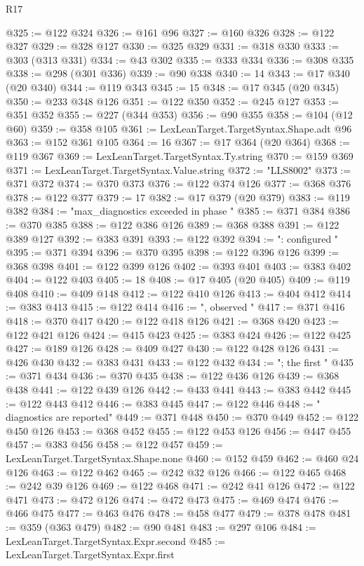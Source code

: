 \begin{lexlean}{R17}
\begin{coremodule}
@325 := @122 @324
@326 := @161 @96
@327 := @160 @326
@328 := @122 @327
@329 := @328 @127
@330 := @325 @329
@331 := @318 @330
@333 := @303 (@313 @331)
@334 := @43 @302
@335 := @333 @334
@336 := @308 @335
@338 := @298 (@301 @336)
@339 := @90 @338
@340 := 14
@343 := @17 @340 (@20 @340)
@344 := @119 @343
@345 := 15
@348 := @17 @345 (@20 @345)
@350 := @233 @348 @126
@351 := @122 @350
@352 := @245 @127
@353 := @351 @352
@355 := @227 (@344 @353)
@356 := @90 @355
@358 := @104 (@12 @60)
@359 := @358 @105
@361 := LexLeanTarget.TargetSyntax.Shape.adt @96
@363 := @152 @361 @105
@364 := 16
@367 := @17 @364 (@20 @364)
@368 := @119 @367
@369 := LexLeanTarget.TargetSyntax.Ty.string
@370 := @159 @369
@371 := LexLeanTarget.TargetSyntax.Value.string
@372 := "LLS8002"
@373 := @371 @372
@374 := @370 @373
@376 := @122 @374 @126
@377 := @368 @376
@378 := @122 @377
@379 := 17
@382 := @17 @379 (@20 @379)
@383 := @119 @382
@384 := "max_diagnostics exceeded in phase "
@385 := @371 @384
@386 := @370 @385
@388 := @122 @386 @126
@389 := @368 @388
@391 := @122 @389 @127
@392 := @383 @391
@393 := @122 @392
@394 := ": configured "
@395 := @371 @394
@396 := @370 @395
@398 := @122 @396 @126
@399 := @368 @398
@401 := @122 @399 @126
@402 := @393 @401
@403 := @383 @402
@404 := @122 @403
@405 := 18
@408 := @17 @405 (@20 @405)
@409 := @119 @408
@410 := @409 @148
@412 := @122 @410 @126
@413 := @404 @412
@414 := @383 @413
@415 := @122 @414
@416 := ", observed "
@417 := @371 @416
@418 := @370 @417
@420 := @122 @418 @126
@421 := @368 @420
@423 := @122 @421 @126
@424 := @415 @423
@425 := @383 @424
@426 := @122 @425
@427 := @189 @126
@428 := @409 @427
@430 := @122 @428 @126
@431 := @426 @430
@432 := @383 @431
@433 := @122 @432
@434 := "; the first "
@435 := @371 @434
@436 := @370 @435
@438 := @122 @436 @126
@439 := @368 @438
@441 := @122 @439 @126
@442 := @433 @441
@443 := @383 @442
@445 := @122 @443 @412
@446 := @383 @445
@447 := @122 @446
@448 := " diagnostics are reported"
@449 := @371 @448
@450 := @370 @449
@452 := @122 @450 @126
@453 := @368 @452
@455 := @122 @453 @126
@456 := @447 @455
@457 := @383 @456
@458 := @122 @457
@459 := LexLeanTarget.TargetSyntax.Shape.none
@460 := @152 @459
@462 := @460 @24 @126
@463 := @122 @462
@465 := @242 @32 @126
@466 := @122 @465
@468 := @242 @39 @126
@469 := @122 @468
@471 := @242 @41 @126
@472 := @122 @471
@473 := @472 @126
@474 := @472 @473
@475 := @469 @474
@476 := @466 @475
@477 := @463 @476
@478 := @458 @477
@479 := @378 @478
@481 := @359 (@363 @479)
@482 := @90 @481
@483 := @297 @106
@484 := LexLeanTarget.TargetSyntax.Expr.second
@485 := LexLeanTarget.TargetSyntax.Expr.first

\end{coremodule}
\end{lexlean}
